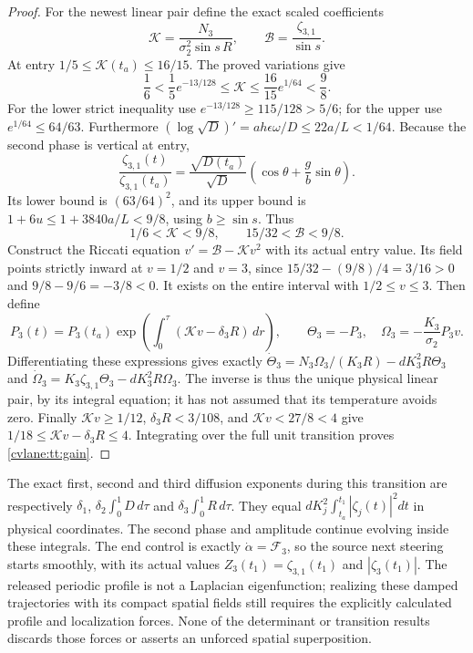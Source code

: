 \begin{proof}
For the newest linear pair define the exact scaled coefficients
\[
 \mathcal K=\frac{N_3}{\sigma_2^2\sin s\,R},\qquad
 \mathcal B=\frac{\zeta_{3,1}}{\sin s}.
\]
At entry $1/5\leq\mathcal K(t_a)\leq16/15$.
The proved variations give
\[
 \frac16<\frac15e^{-13/128}\leq\mathcal K
 \leq\frac{16}{15}e^{1/64}<\frac98.
\]
For the lower strict inequality use $e^{-13/128}\geq115/128>5/6$;
for the upper use $e^{1/64}\leq64/63$.
Furthermore $(\log\sqrt D)'=ah\epsilon\omega/D\leq22a/L<1/64$.
Because the second phase is vertical at entry,
\[
 \frac{\zeta_{3,1}(t)}{\zeta_{3,1}(t_a)}
 =\frac{\sqrt{D(t_a)}}{\sqrt D}
        \left(\cos\theta+\frac gb\sin\theta\right).
\]
Its lower bound is $(63/64)^2$, and its upper bound is
$1+6u\leq1+3840a/L<9/8$, using $b\geq\sin s$.
Thus
\begin{equation}\label{cvlane:tt:newestcoefficientbox}
 1/6<\mathcal K<9/8,\qquad 15/32<\mathcal B<9/8.
\end{equation}
Construct the Riccati equation $v'=\mathcal B-\mathcal K v^2$
with its actual entry value. Its field points strictly inward at
$v=1/2$ and $v=3$, since
$15/32-(9/8)/4=3/16>0$ and $9/8-9/6=-3/8<0$.
It exists on the entire interval with $1/2\leq v\leq3$.
Then define
\begin{equation}\label{cvlane:tt:amplitudeinverse}
 P_3(t)=P_3(t_a)
 \exp\!\left(\int_0^\tau(\mathcal K v-\delta_3R)\,dr\right),
 \qquad \Theta_3=-P_3,\quad
 \Omega_3=-\frac{K_3}{\sigma_2}P_3v.
\end{equation}
Differentiating these expressions gives exactly
$\dot\Theta_3=N_3\Omega_3/(K_3R)-dK_3^2R\Theta_3$
and $\dot\Omega_3=K_3\zeta_{3,1}\Theta_3-dK_3^2R\Omega_3$.
The inverse is thus the unique physical linear pair, by its integral
equation; it has not assumed that its temperature avoids zero.
Finally $\mathcal K v\geq1/12$, $\delta_3R<3/108$, and
$\mathcal K v<27/8<4$ give
$1/18\leq\mathcal K v-\delta_3R\leq4$.
Integrating over the full unit transition proves \eqref{cvlane:tt:gain}.
\end{proof}

The exact first, second and third diffusion exponents during this
transition are respectively $\delta_1$, $\delta_2\int_0^1D\,d\tau$
and $\delta_3\int_0^1R\,d\tau$. They equal
$dK_j^2\int_{t_a}^{t_1}|\zeta_j(t)|^2dt$ in physical coordinates.
The second phase and amplitude continue evolving inside these
integrals. The end control is exactly $\dot\alpha=\mathcal F_3$,
so the source next steering starts smoothly, with its actual values
$Z_3(t_1)=\zeta_{3,1}(t_1)$ and $|\zeta_3(t_1)|$.
The released periodic profile is not a Laplacian eigenfunction;
realizing these damped trajectories with its compact spatial fields
still requires the explicitly calculated profile and localization
forces. None of the determinant or transition results discards those
forces or asserts an unforced spatial superposition.



